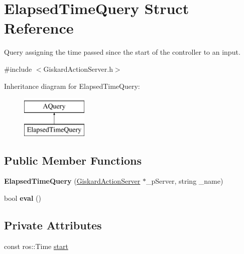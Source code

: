 \hypertarget{structElapsedTimeQuery}{\section{Elapsed\-Time\-Query Struct Reference}
\label{structElapsedTimeQuery}
}


Query assigning the time passed since the start of the controller to an input.  




{\ttfamily \#include $<$Giskard\-Action\-Server.\-h$>$}

Inheritance diagram for Elapsed\-Time\-Query\-:\begin{figure}[H]
\begin{center}
\leavevmode
\includegraphics[height=2.000000cm]{structElapsedTimeQuery}
\end{center}
\end{figure}
\subsection*{Public Member Functions}
\begin{DoxyCompactItemize}
\item 
\hypertarget{structElapsedTimeQuery_ae73be34187f2bb1cc78290a7cda92021}{{\bfseries Elapsed\-Time\-Query} (\hyperlink{classGiskardActionServer}{Giskard\-Action\-Server} $\ast$\-\_\-p\-Server, string \-\_\-name)}\label{structElapsedTimeQuery_ae73be34187f2bb1cc78290a7cda92021}

\item 
\hypertarget{structElapsedTimeQuery_a59daf36a1a9d65eb30c43b51f52b6ef7}{bool {\bfseries eval} ()}\label{structElapsedTimeQuery_a59daf36a1a9d65eb30c43b51f52b6ef7}

\end{DoxyCompactItemize}
\subsection*{Private Attributes}
\begin{DoxyCompactItemize}
\item 
const ros\-::\-Time \hyperlink{structElapsedTimeQuery_a4b53ade61743b5e03306d177a09a0dd7}{start}
\end{DoxyCompactItemize}
